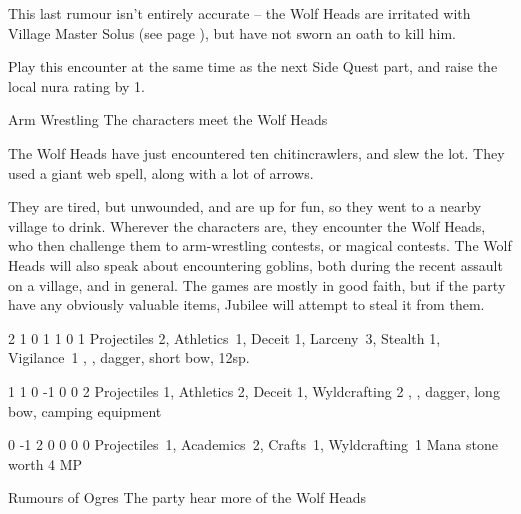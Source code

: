 \begin{multicols}{2}
This last rumour isn't entirely accurate -- the Wolf Heads are irritated with Village Master Solus (see page \pageref{solus}), but have not sworn an oath to kill him.

Play this encounter at the same time as the next Side Quest part, and raise the local nura rating by 1.

{Arm Wrestling}%
{The characters meet the Wolf Heads}%
\label{wolfHeads}

The Wolf Heads have just encountered ten chitincrawlers, and slew the lot.
They used a giant web spell, along with a lot of arrows.

They are tired, but unwounded, and are up for fun, so they went to a nearby village to drink.
Wherever the characters are, they encounter the Wolf Heads, who then challenge them to arm-wrestling contests, or magical contests.
The Wolf Heads will also speak about encountering goblins, both during the recent assault on a village, and in general.
The games are mostly in good faith, but if the party have any obviously valuable items, Jubilee will attempt to steal it from them.

{2}%
{1}%
{{0}%
{1}%
{1}}%
{0}%
{1}%
{Projectiles 2, Athletics~1, Deceit 1, Larceny~3, Stealth 1, Vigilance~1\knacks{\snapshot, \laststand}}%
{\shortsword, \partialleather, dagger, short bow, 12sp.}%
{\addtocounter{fp}{5}}

{1}%
{1}%
{{0}%
{-1}%
{0}}%
{0}%
{2}%
{Projectiles 1, Athletics 2, Deceit 1, Wyldcrafting 2\knacks{\adrenalinesurge, \unstoppable, \finishingblow, \charge}}%
{\greatsword, \partialchain, dagger, long bow, camping equipment}%
{}

{0}%
{-1}%
{{2}%
{0}%
{0}}%
{0}%
{0}%
{Projectiles~1, Academics~2, Crafts~1, Wyldcrafting~1
\knacks{\combatcaster, \alchemist}
}%
{Mana stone worth 4 MP}%
{}

\beardedalemaster
\label{beardedalemaster}

{\N \squash Rumours of Ogres}%
{The party hear more of the Wolf Heads}%


\end{multicols}
